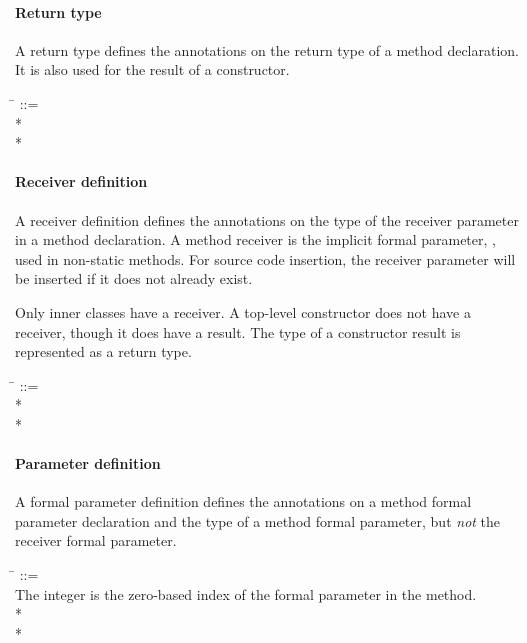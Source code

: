 \documentclass{article}
\newcommand{\code}[1]{\ifmmode{\mbox{\relax\ttfamily{#1}}}\else{\relax\ttfamily #1}\fi}
\begin{document}


\paragraph{Return type}

A return type defines the annotations on the return type of a method
declaration.  It is also used for the result of a constructor.

\begin{tabbing}
\qquad \= \kill
{} ::=  \\
\qquad    {} * \lineend \\
\qquad        {}*
\end{tabbing}


\paragraph{Receiver definition}

A receiver definition defines the annotations on the type of the receiver
parameter in a method declaration.  A method receiver is the implicit formal
parameter, \code{this}, used in non-static methods.  For source code insertion,
the receiver parameter will be inserted if it does not already exist.

Only inner classes have a receiver.  A top-level constructor does not have
a receiver, though it does have a result.  The type of a constructor result
is represented as a return type.

\begin{tabbing}
\qquad \= \kill
{} ::=  \\
\qquad    {} * \lineend \\
\qquad    {}*
\end{tabbing}


\paragraph{Parameter definition}

A formal parameter definition defines the annotations on a method formal
parameter declaration and the type of a method formal parameter, but
\emph{not} the receiver formal parameter.

\begin{tabbing}
\qquad \= \kill
{} ::= \\
\qquad    \bnfcmt The integer is the zero-based index of the formal parameter in the method. \\
\qquad    {}  \bnflit{:} * \lineend \\
\qquad    {}*
\end{tabbing}
\end{document}
